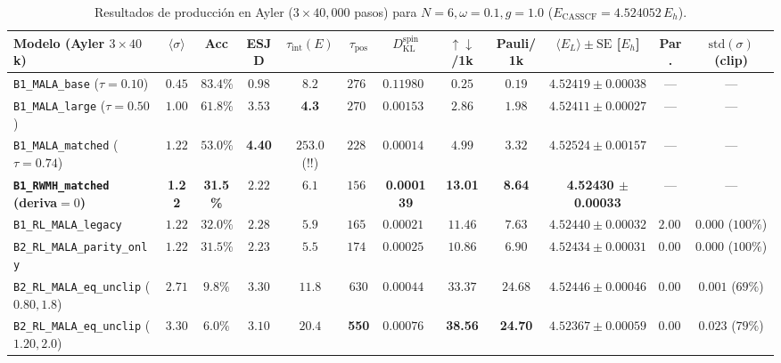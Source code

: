 \documentclass[10pt,a4paper]{article}
\begin{document}
\begin{table}[H]
\centering
\caption{Resultados de producción en Ayler ($3\times 40{,}000$ pasos) para $N=6, \omega=0.1, g=1.0$ ($E_{\mathrm{CASSCF}} = 4.524052\,E_h$).}
\label{tab:ayler_n6_g1}
\begin{adjustbox}{max width=\textwidth}
\begin{tabular}{lccccccccccc}
\toprule
\textbf{Modelo (Ayler $3\times 40$k)} & $\langle\sigma\rangle$ & \textbf{Acc} & \textbf{ESJD} & $\tau_{\mathrm{int}}(E)$ & $\tau_{\mathrm{pos}}$ & $D_{\mathrm{KL}}^{\mathrm{spin}}$ & \textbf{$\uparrow\downarrow$/1k} & \textbf{Pauli/1k} & $\langle E_L\rangle \pm \mathrm{SE}$ [$E_h$] & \textbf{Par.} & $\mathrm{std}(\sigma)$ (\textbf{clip}) \\
\midrule
\texttt{B1\_MALA\_base} ($\tau=0.10$) & $0.45$ & $83.4\%$ & $0.98$ & $8.2$ & $2764$ & $0.119801$ & $0.25$ & $0.19$ & $4.52419 \pm 0.00038$ & --- & --- \\
\texttt{B1\_MALA\_large} ($\tau=0.50$) & $1.00$ & $61.8\%$ & $3.53$ & \textbf{4.3} & $2705$ & $0.001530$ & $2.86$ & $1.98$ & $4.52411 \pm 0.00027$ & --- & --- \\
\texttt{B1\_MALA\_matched} ($\tau=0.74$) & $1.22$ & $53.0\%$ & \textbf{4.40} & $253.0$ (!!) & $2288$ & $0.000146$ & $4.99$ & $3.32$ & $4.52524 \pm 0.00157$ & --- & --- \\
\textbf{\texttt{B1\_RWMH\_matched} (deriva$=0$)} & \textbf{1.22} & \textbf{31.5\%} & $2.22$ & $6.1$ & $1569$ & \textbf{0.000139} & \textbf{13.01} & \textbf{8.64} & \textbf{4.52430 $\pm$ 0.00033} & --- & --- \\
\texttt{B1\_RL\_MALA\_legacy} & $1.22$ & $32.0\%$ & $2.28$ & $5.9$ & $1658$ & $0.000214$ & $11.46$ & $7.63$ & $4.52440 \pm 0.00032$ & $2.000$ & $0.000$ ($100\%$) \\
\texttt{B2\_RL\_MALA\_parity\_only} & $1.22$ & $31.5\%$ & $2.23$ & $5.5$ & $1747$ & $0.000254$ & $10.86$ & $6.90$ & $4.52434 \pm 0.00031$ & $0.000$ & $0.000$ ($100\%$) \\
\texttt{B2\_RL\_MALA\_eq\_unclip} ($0.80, 1.8$) & $2.71$ & $9.8\%$ & $3.30$ & $11.8$ & $630$ & $0.000444$ & $33.37$ & $24.68$ & $4.52446 \pm 0.00046$ & $0.000$ & $0.001$ ($69\%$) \\
\texttt{B2\_RL\_MALA\_eq\_unclip} ($1.20, 2.0$) & $3.30$ & $6.0\%$ & $3.10$ & $20.4$ & \textbf{550} & $0.000761$ & \textbf{38.56} & \textbf{24.70} & $4.52367 \pm 0.00059$ & $0.000$ & $0.023$ ($79\%$) \\
\bottomrule
\end{tabular}
\end{adjustbox}
\end{table}
\end{document}
